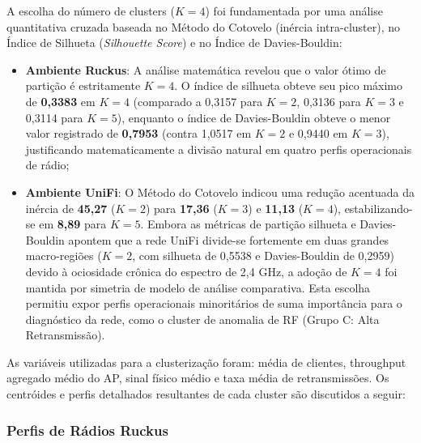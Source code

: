 A escolha do número de clusters ($K=4$) foi fundamentada por uma análise quantitativa cruzada baseada no Método do Cotovelo (inércia intra-cluster), no Índice de Silhueta (\textit{Silhouette Score}) e no Índice de Davies-Bouldin:
\begin{itemize}
  \item \textbf{Ambiente Ruckus}: A análise matemática revelou que o valor ótimo de partição é estritamente $K=4$. O índice de silhueta obteve seu pico máximo de \textbf{0,3383} em $K=4$ (comparado a 0,3157 para $K=2$, 0,3136 para $K=3$ e 0,3114 para $K=5$), enquanto o índice de Davies-Bouldin obteve o menor valor registrado de \textbf{0,7953} (contra 1,0517 em $K=2$ e 0,9440 em $K=3$), justificando matematicamente a divisão natural em quatro perfis operacionais de rádio;
  \item \textbf{Ambiente UniFi}: O Método do Cotovelo indicou uma redução acentuada da inércia de \textbf{45,27} ($K=2$) para \textbf{17,36} ($K=3$) e \textbf{11,13} ($K=4$), estabilizando-se em \textbf{8,89} para $K=5$. Embora as métricas de partição silhueta e Davies-Bouldin apontem que a rede UniFi divide-se fortemente em duas grandes macro-regiões ($K=2$, com silhueta de 0,5538 e Davies-Bouldin de 0,2959) devido à ociosidade crônica do espectro de 2,4 GHz, a adoção de $K=4$ foi mantida por simetria de modelo de análise comparativa. Esta escolha permitiu expor perfis operacionais minoritários de suma importância para o diagnóstico da rede, como o cluster de anomalia de RF (Grupo C: Alta Retransmissão).

\end{itemize}
As variáveis utilizadas para a clusterização foram: média de clientes, throughput agregado médio do AP, sinal físico médio e taxa média de retransmissões. Os centróides e perfis detalhados resultantes de cada cluster são discutidos a seguir:

\subsubsection{Perfis de Rádios Ruckus}

\begin{table}[H]
\end{table}

